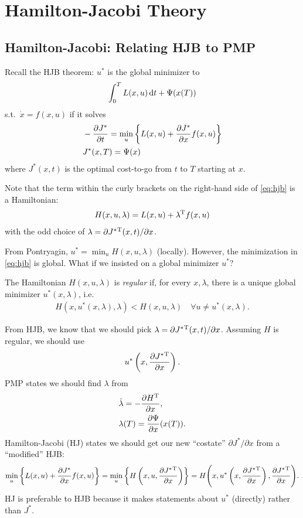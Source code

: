 \chapter{Hamilton-Jacobi Theory}

\section{Hamilton-Jacobi: Relating HJB to PMP}
Recall the HJB theorem: $u^*$ is the global minimizer to
\begin{gather}
  \int_0^T L(x,u)\mathop{}\!\mathrm{d} t + \Psi(x(T))
\end{gather}
s.t.\ $\dot x=f(x,u)$ if it solves
\begin{align}
  & -\frac{\partial J^*}{\partial t} = \min_u \left\{ L(x,u) + \frac{\partial J^*}{\partial x} f(x,u) \right\} \label{eq:hjb} \\
  & J^*(x,T) = \Psi(x)
\end{align}
where $J^*(x,t)$ is the optimal cost-to-go from $t$ to $T$ starting at $x$.

Note that the term within the curly brackets on the right-hand side of \eqref{eq:hjb} is a Hamiltonian:
\begin{gather}
  H(x,u,\lambda) = L(x,u) + \lambda^\text{T} f(x,u)
\end{gather}
with the odd choice of $\lambda=\partial J^*{}^\text{T}(x,t)/\partial x$.

From Pontryagin, $u^*=\min_u H(x,u,\lambda)$ (locally). However, the minimization in \eqref{eq:hjb} is global. What if we insisted on a global minimizer $u^*$?

\begin{defi}
  The Hamiltonian $H(x,u,\lambda)$ is \emph{regular} if, for every $x,\lambda$, there is a unique global minimizer $u^*(x,\lambda)$, i.e.\
  \begin{gather}
    H(x,u^*(x,\lambda),\lambda) < H(x,u,\lambda) \quad \forall u\neq u^*(x,\lambda).
  \end{gather}
\end{defi}

From HJB, we know that we should pick $\lambda=\partial J^*{}^\text{T}(x,t)/\partial x$. Assuming $H$ is regular, we should use
\begin{gather}
  u^*\left(x,\frac{\partial J^*{}^\text{T}}{\partial x}\right).
\end{gather}
PMP states we should find $\lambda$ from
\begin{align}
  & \dot \lambda = -\frac{\partial H^\text{T}}{\partial x}, \\
  & \lambda(T) = \frac{\partial \Psi}{\partial x}(x(T)).
\end{align}
Hamilton-Jacobi (HJ) states we should get our new ``costate'' $\partial J^*/\partial x$ from a ``modified'' HJB:
\begin{gather}
  \min_u \left\{ L(x,u) + \frac{\partial J^*}{\partial x} f(x,u) \right\} = \min_u \left\{ H\left(x,u,\frac{\partial J^*{}^\text{T}}{\partial x}\right) \right\} = H\Bigg( x, u^*\left(x,\frac{\partial J^*{}^\text{T}}{\partial x}\right), \frac{\partial J^*{}^\text{T}}{\partial x} \Bigg).
\end{gather}
HJ is preferable to HJB because it makes statements about $u^*$ (directly) rather than $J^*$.

